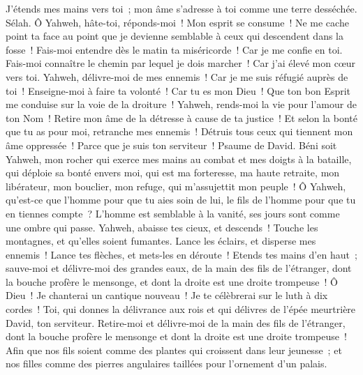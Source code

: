 \begin{multicols}{2}
J'étends mes mains vers toi~; mon âme s'adresse à toi comme une terre desséchée. Sélah.
Ô Yahweh, hâte-toi, réponds-moi~! Mon esprit se consume~! Ne me cache point ta face au point que je devienne semblable à ceux qui descendent dans la fosse~!
Fais-moi entendre dès le matin ta miséricorde~! Car je me confie en toi. Fais-moi connaître le chemin par lequel je dois marcher~! Car j'ai élevé mon cœur vers toi.
Yahweh, délivre-moi de mes ennemis~! Car je me suis réfugié auprès de toi~!
Enseigne-moi à faire ta volonté~! Car tu es mon Dieu~! Que ton bon Esprit me conduise sur la voie de la droiture~!
Yahweh, rends-moi la vie pour l'amour de ton Nom~! Retire mon âme de la détresse à cause de ta justice~!
Et selon la bonté que tu as pour moi, retranche mes ennemis~! Détruis tous ceux qui tiennent mon âme oppressée~! Parce que je suis ton serviteur~!
\VerseOne{}Psaume de David. Béni soit Yahweh, mon rocher qui exerce mes mains au combat et mes doigts à la bataille,
qui déploie sa bonté envers moi, qui est ma forteresse, ma haute retraite, mon libérateur, mon bouclier, mon refuge, qui m'assujettit mon peuple~!
Ô Yahweh, qu'est-ce que l'homme pour que tu aies soin de lui, le fils de l'homme pour que tu en tiennes compte~?
L'homme est semblable à la vanité, ses jours sont comme une ombre qui passe.
Yahweh, abaisse tes cieux, et descends~! Touche les montagnes, et qu'elles soient fumantes.
Lance les éclairs, et disperse mes ennemis~! Lance tes flèches, et mets-les en déroute~!
Etends tes mains d'en haut~; sauve-moi et délivre-moi des grandes eaux, de la main des fils de l'étranger,
dont la bouche profère le mensonge, et dont la droite est une droite trompeuse~!
Ô Dieu~! Je chanterai un cantique nouveau~! Je te célèbrerai sur le luth à dix cordes~!
Toi, qui donnes la délivrance aux rois et qui délivres de l'épée meurtrière David, ton serviteur.
Retire-moi et délivre-moi de la main des fils de l'étranger, dont la bouche profère le mensonge et dont la droite est une droite trompeuse~!
Afin que nos fils soient comme des plantes qui croissent dans leur jeunesse~; et nos filles comme des pierres angulaires taillées pour l'ornement d'un palais.

\end{multicols}
